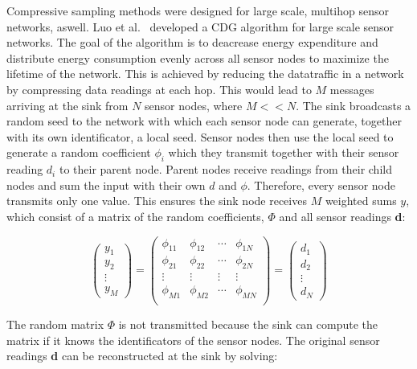 Compressive sampling methods were designed for large scale, multihop sensor
networks, aswell. Luo et al.~\cite{luo2009compressive} developed a \ac{CDG}
algorithm for large scale sensor networks. The goal of the algorithm is to
deacrease energy expenditure and distribute energy consumption evenly across
all sensor nodes to maximize the lifetime of the network. This is achieved by
reducing the datatraffic in a network by compressing data readings at each hop.
This would lead to $ M $ messages arriving at the sink from $ N $ sensor nodes,
where $ M << N $. The sink broadcasts a random seed to the network with which
each sensor node can generate, together with its own identificator, a local
seed. Sensor nodes then use the local seed to generate a random coefficient $
\phi_i $ which they transmit together with their sensor reading $ d_i $ to
their parent node. Parent nodes receive readings from their child nodes and sum
the input with their own $ d $ and $ \phi $. Therefore, every sensor node
transmits only one value. This ensures the sink node receives $ M $ weighted
sums $ y $, which consist of a matrix of the random coefficients, $ \Phi $ and
all sensor readings \textbf{d}:

$$
\begin{pmatrix}
    y_1 \\
    y_2 \\
    \vdots \\
    y_M
\end{pmatrix}
=
\begin{pmatrix}
    \phi_{11} & \phi_{12} & \dotsb & \phi_{1N}\\
    \phi_{21} & \phi_{22} & \dotsb & \phi_{2N}\\
    \vdots & \vdots & \vdots & \vdots\\
    \phi_{M1} & \phi_{M2} & \dotsb & \phi_{MN}\\
\end{pmatrix}
=
\begin{pmatrix}
    d_1 \\
    d_2 \\
    \vdots \\
    d_N
\end{pmatrix}
$$

The random matrix $ \Phi $ is not transmitted because the sink can compute the
matrix if it knows the identificators of the sensor nodes. The original
sensor readings \textbf{d} can be reconstructed at the sink by solving:

